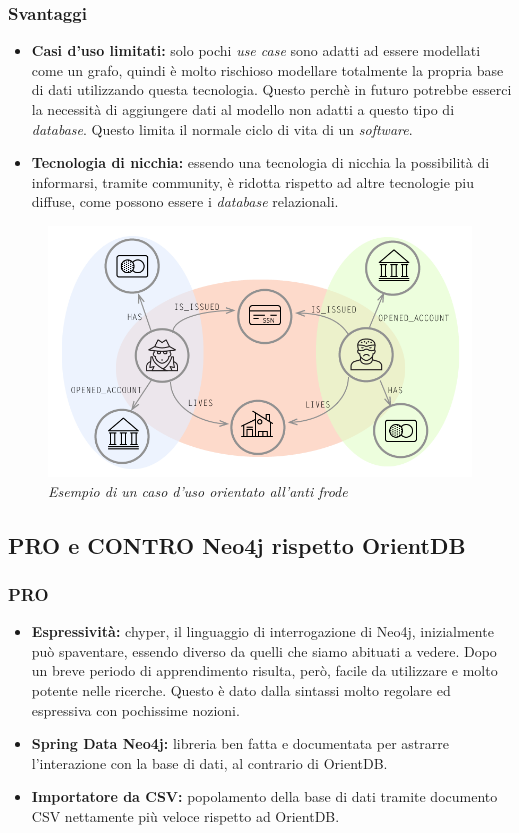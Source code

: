 \subsubsection{Svantaggi}
\begin{itemize}
\item{\textbf{Casi d'uso limitati:}} solo pochi \textit{use case} sono adatti ad essere modellati come un grafo, quindi è molto rischioso modellare totalmente la propria base di dati utilizzando questa tecnologia. Questo perchè in futuro potrebbe esserci la necessità di aggiungere dati al modello non adatti a questo tipo di \textit{database}. Questo limita il normale ciclo di vita di un \textit{software}.
\item{\textbf{Tecnologia di nicchia:}} essendo una tecnologia di nicchia la possibilità di informarsi, tramite community, è ridotta rispetto ad altre tecnologie piu diffuse, come possono essere i \textit{database} relazionali.
\end{itemize}
\newpage
\begin{figure}[!ht]
	\centering
	\includegraphics[scale=0.33]{immagini/fraud.png}
	\caption{\textit{Esempio di un caso d'uso orientato all'anti frode }}
\end{figure}


\subsection{PRO e CONTRO Neo4j rispetto OrientDB}
\subsubsection{PRO}
\begin{itemize}
\item{\textbf{Espressività:}} chyper, il linguaggio di interrogazione di Neo4j, inizialmente può spaventare, essendo diverso da quelli che siamo abituati a vedere. Dopo un breve periodo di apprendimento risulta, però, facile da utilizzare e molto potente nelle ricerche. Questo è dato dalla sintassi molto regolare ed espressiva con pochissime nozioni.
\item{\textbf{Spring Data Neo4j:}} libreria ben fatta e documentata per astrarre l'interazione con la base di dati, al contrario di OrientDB.
\item{\textbf{Importatore da CSV:}} popolamento della base di dati tramite documento CSV nettamente più veloce rispetto ad OrientDB.
\end{itemize}
